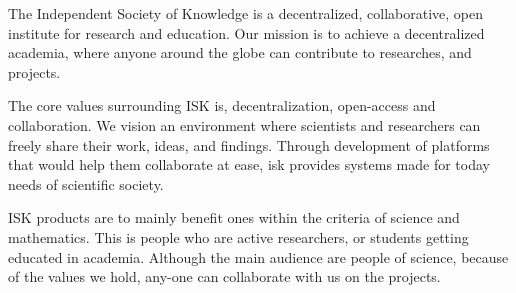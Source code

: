 The Independent Society of Knowledge is a decentralized, collaborative, open institute for research and education.
Our mission is to achieve a decentralized academia, where anyone around the globe can contribute to researches, and projects.


 The core values surrounding ISK is, decentralization, open-access and collaboration.
We vision an environment where scientists and researchers can freely share their work, ideas, and findings.
Through development of platforms that would help them collaborate at ease, isk provides systems made for today needs of scientific society.

 ISK products are to mainly benefit ones within the criteria of science and mathematics.
This is people who are active researchers, or students getting educated in academia.
Although the main audience are people of science, because of the values we hold, any-one can collaborate with us on the projects.
